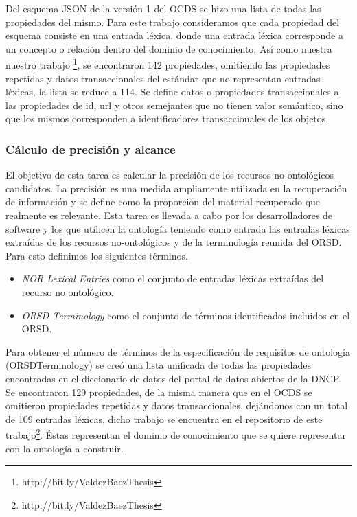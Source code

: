 Del esquema JSON de la versión 1 del OCDS se hizo una lista de todas las propiedades del mismo. Para este trabajo consideramos que cada propiedad del esquema consiste en una entrada léxica, donde una entrada léxica corresponde a un concepto o relación dentro del dominio de conocimiento. Así como nuestra nuestro trabajo \footnote{http://bit.ly/ValdezBaezThesis}, se encontraron 142 propiedades, omitiendo las propiedades repetidas y datos transaccionales del estándar que no representan entradas léxicas, la lista se reduce a 114. Se define datos o propiedades transaccionales a las propiedades de id, url y otros semejantes que no tienen valor semántico, sino que los mismos corresponden a identificadores transaccionales de los objetos.

\subsubsection{Cálculo de precisión y alcance}

El objetivo de esta tarea es calcular la precisión de los recursos no-ontológicos candidatos. La precisión es una medida ampliamente utilizada en la recuperación de información y se define como la proporción del material recuperado que realmente es relevante. Esta tarea es llevada a cabo por los desarrolladores de software y los que utilicen la ontología teniendo como entrada las entradas léxicas extraídas de los recursos no-ontológicos y de la terminología reunida del ORSD. Para esto definimos los siguientes términos.

\begin{itemize}
    \item \textit{NOR Lexical Entries}  como el conjunto de entradas léxicas extraídas del recurso no ontológico.	
    \item \textit{ORSD Terminology} como el conjunto de términos identificados incluidos en el ORSD. 
\end{itemize}

Para obtener el número de términos de la especificación de requisitos de ontología (ORSDTerminology) se creó una lista unificada de todas las propiedades encontradas en el diccionario de datos del portal de datos abiertos de la DNCP.  Se encontraron 129 propiedades, de la misma manera que en el OCDS se omitieron propiedades repetidas y datos transaccionales, dejándonos con un total de 109 entradas léxicas, dicho trabajo se encuentra en el repositorio de este trabajo\footnote{http://bit.ly/ValdezBaezThesis}. Éstas representan el dominio de conocimiento que se quiere representar con la ontología a construir.

